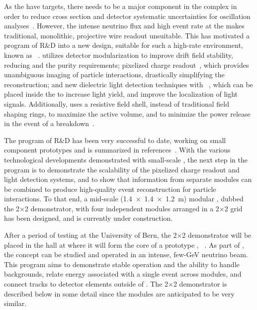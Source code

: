 As the   have  targets, there needs to be a major  component in the    complex in order to reduce cross section and detector systematic uncertainties for oscillation analyses~\cite{Acciarri:2016crz, Acciarri:2015uup}. However, the intense neutrino flux and high event rate at the   makes traditional, monolithic, projective wire readout  unsuitable.  This has motivated a program of R\&D into a new  design, suitable for such a high-rate environment, known as ~\cite{argoncube_loi}.  utilizes detector modularization to improve drift field stability, reducing  and the  purity requirements; pixelized charge readout~\cite{Asaadi:2018oxk, larpix}, which provides unambiguous \threed imaging of particle interactions, drastically simplifying the reconstruction; and new dielectric light detection techniques with ~\cite{Auger:2017flc}, which can be placed inside the  to increase light yield, and improve the localization of light signals. Additionally,  uses a resistive field shell, instead of traditional field shaping rings, to maximize the active volume, and to minimize the power release in the event of a breakdown~\cite{bib:docdb10419}. 

The program of  R\&D has been very successful to date, working on small component prototypes and is summarized in references~\cite{ Ereditato:2013xaa, Zeller:2013sva, art_cold_ero, Asaadi:2018oxk, Cavanna:2014iqa, larpix, bib:docdb10419, Auger:2017flc}. 
With the various technological developments demonstrated with small-scale , the next step in the  program is to demonstrate the scalability of the pixelized charge readout and light detection systems, and to show that information from separate modules can be combined to produce high-quality event reconstruction for particle interactions. To that end, a mid-scale (\SI[product-units=repeat]{1.4x1.4x1.2}{\metre}) modular , dubbed the  2$\times$2 demonstrator, with four independent  modules arranged in a 2$\times$2 grid has been designed, and is currently under construction. 

After a period of testing at the University of Bern, the  2$\times$2 demonstrator will be placed in the    hall at  where it will form the core of a prototype   , ~\cite{bib:docdb12571}.   As part of  , the  concept can be studied and operated in an intense, few-GeV neutrino beam.  This program aims to demonstrate stable operation and the ability to handle backgrounds, relate energy associated with a single event across  modules, and connect tracks to detector elements outside of .  The  2$\times$2 demonstrator is described below in some detail since the    modules are anticipated to be very similar.


